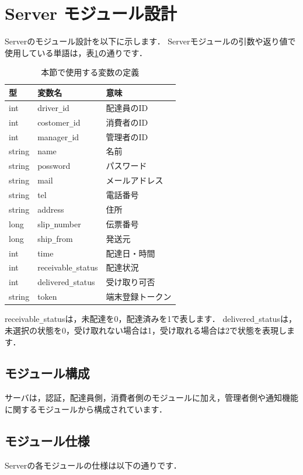 \documentclass[a4j,titlepage]{jarticle}
\begin{document}
\section{Server モジュール設計}
Serverのモジュール設計を以下に示します．
Serverモジュールの引数や返り値で使用している単語は，表\ref{serverTable}の通りです．
\begin{table}[htb]
\centering
\caption{本節で使用する変数の定義}
\label{serverTable}
\begin{tabular}{|lll|}
\hline
型 & 変数名 & 意味      \\ \hline
int & driver\verb|_|id & 配達員のID     \\
int & costomer\verb|_|id & 消費者のID     \\
int & manager\verb|_|id & 管理者のID     \\
string  & name  & 名前     \\
string & possword & パスワード     \\
string & mail & メールアドレス     \\
string & tel & 電話番号     \\
string & address & 住所     \\
long  &  slip\verb|_|number  & 伝票番号   \\
long & ship\verb|_|from & 発送元     \\
int & time & 配達日・時間     \\
int & receivable\verb|_|status & 配達状況    \\
int & delivered\verb|_|status  &  受け取り可否  \\
string & token & 端末登録トークン \\ \hline
\end{tabular}
\end{table}
receivable\verb|_|statusは，未配達を0，配達済みを1で表します．
delivered\verb|_|statusは，未選択の状態を0，受け取れない場合は1，受け取れる場合は2で状態を表現します．
\clearpage

\subsection{モジュール構成}
サーバは，認証，配達員側，消費者側のモジュールに加え，管理者側や通知機能に関するモジュールから構成されています．

\subsection{モジュール仕様}
Serverの各モジュールの仕様は以下の通りです．
\end{document}

